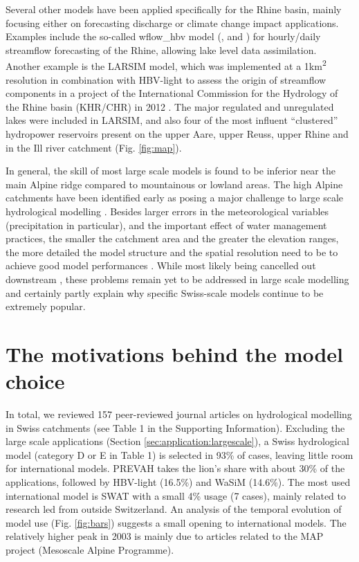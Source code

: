 \documentclass[10pt,a4paper]{article}
\begin{document}
Several other models have been applied specifically for the Rhine basin, mainly focusing either on forecasting discharge or climate change impact applications. Examples include the so-called wflow\_hbv model (\citealp{van_Osnabrugge_2017}, \citealp{van_Osnabrugge_2019} and \citealt{van_Osnabrugge}) for hourly/daily streamflow forecasting of the Rhine, allowing lake level data assimilation. Another example is the LARSIM model, which was implemented at a 1km\textsuperscript{2} resolution in combination with HBV-light to assess the origin of streamflow components in a project of the International Commission for the Hydrology of the Rhine basin (KHR/CHR) in 2012 \citep{m2017}. The major regulated and unregulated lakes were included in LARSIM, and also four of the most influent ``clustered'' hydropower reservoirs present on the upper Aare, upper Reuss, upper Rhine and in the Ill river catchment (Fig. \ref{fig:map}).

In general, the skill of most large scale models is found to be inferior near the main Alpine ridge compared to mountainous or lowland areas. The high Alpine catchments have been identified early as posing a major challenge to large scale hydrological modelling \citep{Kleinn_2005}.  Besides larger errors in the meteorological variables (precipitation in particular), and the important effect of water management practices, the smaller the catchment area and the greater the elevation ranges, the more detailed the model structure and the spatial resolution need to be to achieve good model performances \citep{Gurtz2003}. While most likely being cancelled out downstream \citep{Kleinn_2005}, these problems remain yet to be addressed in large scale modelling and certainly partly explain why specific Swiss-scale models continue to be extremely popular. 

\section{The motivations behind the model choice}
\label{sec:motivations}

In total, we reviewed 157 peer-reviewed journal articles on hydrological modelling in Swiss catchments (see Table 1 in the Supporting Information). Excluding the large scale applications (Section \ref{sec:application:largescale}), a Swiss hydrological model (category D or E in Table 1) is selected in 93\% of cases, leaving little room for international models. PREVAH takes the lion's share with about 30\% of the applications, followed by HBV-light (16.5\%) and WaSiM (14.6\%). The most used international model is SWAT with a small 4\% usage (7 cases), mainly related to research led from outside Switzerland. An analysis of the temporal evolution of model use (Fig. \ref{fig:bars}) suggests a small opening to international models. The relatively higher peak in 2003 is mainly due to articles related to the MAP project (Mesoscale Alpine Programme).
\end{document}

